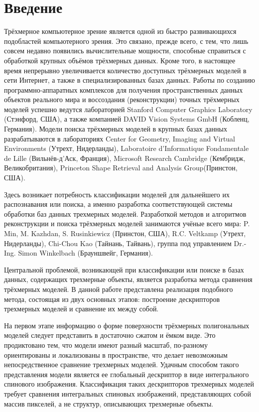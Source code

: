 \documentclass[14pt]{article}
\numberwithin{figure}{section}
\numberwithin{equation}{section}
\begin{document}

\tableofcontents

\newpage

\section*{Введение}

Трёхмерное компьютерное зрение является одной из быстро развивающихся подобластей компьютерного зрения. Это связано, прежде всего, с тем, что лишь совсем недавно появились вычислительные мощности, способные справиться с обработкой крупных объёмов трёхмерных данных. Кроме того, в настоящее время непрерывно увеличивается количество доступных трёхмерных моделей в сети Интернет, а также в специализированных базах данных.%
Работы по созданию программно-аппаратных комплексов для получения пространственных данных объектов реального мира и воссоздания (реконструкции) точных трёхмерных моделей успешно ведутся лабораторией Stanford Computer
Graphics Laboratory (Стэнфорд, США), а также компанией DAVID Vision Systems GmbH (Кобленц, Германия). Модели поиска трёхмерных моделей в крупных базах данных разрабатываются в лабораториях Center for Geometry,
Imaging and Virtual Environments (Утрехт, Нидерланды), Laboratoire d'Informatique Fondamentale de Lille (Вильнёв-д’Аск, Франция), Microsoft Research Cambridge (Кембридж, Великобритания), Princeton Shape Retrieval
and Analysis Group(Принстон, США).%

Здесь возникает потребность классификации моделей для дальнейшего их распознавания или поиска, а именно разработка соответствующей системы обработки баз данных трехмерных моделей.%
Разработкой методов и алгоритмов реконструкции и поиска трёхмерных моделей занимаются учёные всего мира: P. Min, M. Kazhdan, S. Rusinkiewicz (Принстон, США), R.C. Veltkamp (Утрехт, Нидерланды), Chi-Chou Kao (Тайнань, Тайвань), группа под управлением Dr.-Ing. Simon Winkelbach (Брауншвейг, Германия).%

Центральной проблемой, возникающей при классификации или поиске в базах данных, содержащих трехмерные объекты, является разработка метода сравнения трёхмерных моделей. В данной работе представлена реализация подобного метода, состоящая из двух основных этапов: построение дескрипторов трехмерных моделей и сравнение их между собой.

На первом этапе информацию о форме поверхности трёхмерных полигональных моделей следует представить в достаточно сжатом и ёмком виде. Это продиктовано тем, что модели имеют разный масштаб, по-разному ориентированы и локализованы в пространстве, что делает невозможным непосредственное сравнение трехмерных моделей. Удачным способом такого представления модели является ее глобальный дескриптор в виде интегрального спинового изображения\cite{Chernikoff}. Классификация таких дескрипторов трехмерных моделей требует сравнения интегральных спиновых изображений, представляющих собой массив пикселей, а не структур, описывающих трехмерные объекты.
\end{document}
